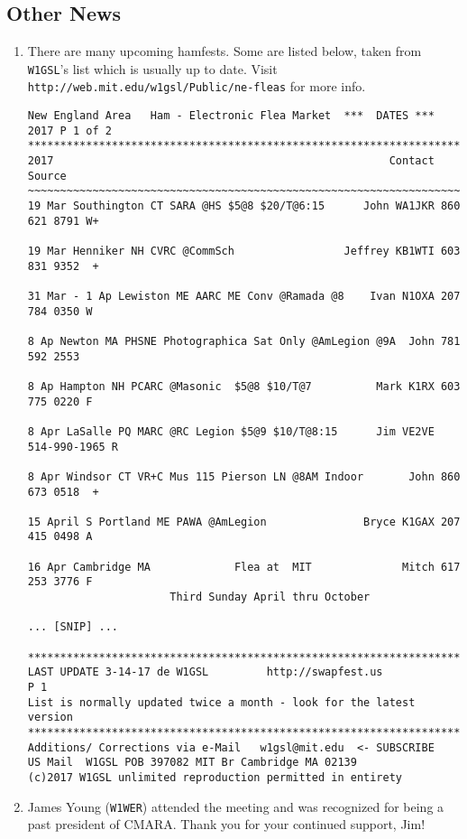 \documentclass[10pt,letterpaper]{article}
\begin{document}
\subsection{Other News}
\begin{enumerate}
\item There are many upcoming hamfests. Some are listed below, taken from \texttt{W1GSL}'s list which is usually up to date. Visit \texttt{http://web.mit.edu/w1gsl/Public/ne-fleas} for more info.

\begin{tcolorbox}
\begin{verbatim}
New England Area   Ham - Electronic Flea Market  ***  DATES ***   2017 P 1 of 2
*******************************************************************************
2017                                                    Contact          Source
~~~~~~~~~~~~~~~~~~~~~~~~~~~~~~~~~~~~~~~~~~~~~~~~~~~~~~~~~~~~~~~~~~~~~~~~~~~~~~~
19 Mar Southington CT SARA @HS $5@8 $20/T@6:15      John WA1JKR 860 621 8791 W+

19 Mar Henniker NH CVRC @CommSch                 Jeffrey KB1WTI 603 831 9352  +

31 Mar - 1 Ap Lewiston ME AARC ME Conv @Ramada @8    Ivan N1OXA 207 784 0350 W

8 Ap Newton MA PHSNE Photographica Sat Only @AmLegion @9A  John 781 592 2553

8 Ap Hampton NH PCARC @Masonic  $5@8 $10/T@7          Mark K1RX 603 775 0220 F

8 Apr LaSalle PQ MARC @RC Legion $5@9 $10/T@8:15      Jim VE2VE 514-990-1965 R

8 Apr Windsor CT VR+C Mus 115 Pierson LN @8AM Indoor       John 860 673 0518  +

15 April S Portland ME PAWA @AmLegion               Bryce K1GAX 207 415 0498 A

16 Apr Cambridge MA             Flea at  MIT              Mitch 617 253 3776 F
                      Third Sunday April thru October

... [SNIP] ...

*******************************************************************************
LAST UPDATE 3-14-17 de W1GSL         http://swapfest.us                    P 1
List is normally updated twice a month - look for the latest version
*******************************************************************************
Additions/ Corrections via e-Mail   w1gsl@mit.edu  <- SUBSCRIBE
US Mail  W1GSL POB 397082 MIT Br Cambridge MA 02139
(c)2017 W1GSL unlimited reproduction permitted in entirety
\end{verbatim}
\end{tcolorbox}

\item James Young (\texttt{W1WER}) attended the meeting and was recognized for being a past president of CMARA. Thank you for your continued support, Jim!
\end{enumerate}
\end{document}
